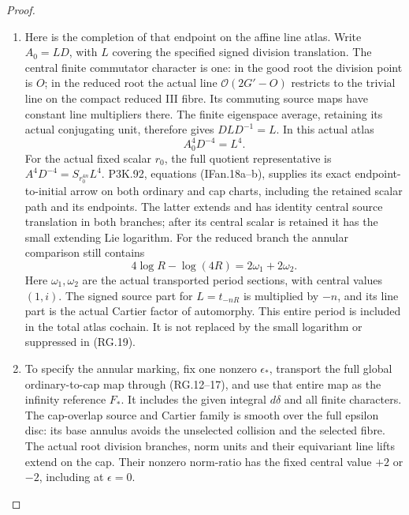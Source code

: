 \begin{proof}
\begin{enumerate}[label=\arabic*.]
\item Here is the completion of that endpoint on the affine line
atlas. Write \(A_0=L D\), with \(L\) covering the specified
signed division translation. The central finite commutator
character is one: in the good root the division point is \(O\);
in the reduced root the actual line
\(\mathcal O(2G'-O)\) restricts to the trivial line on the
compact reduced III fibre. Its commuting source maps have
constant line multipliers there. The finite eigenspace
average, retaining its actual conjugating unit, therefore
gives \(DLD^{-1}=L\). In this actual atlas
\[
                         A_0^4D^{-4}=L^4.
                                                        \tag{RG.19}
\]
For the actual fixed scalar \(r_0\), the full quotient
representative is \(A^4D^{-4}=S_{r_0^{4n}}L^4\).
P3K.92, equations (IFan.18a--b), supplies its exact
endpoint-to-initial arrow on both ordinary and cap charts,
including the retained scalar path and its endpoints.
The latter extends and has identity central source translation
in both branches; after its central scalar is retained it has
the small extending Lie logarithm. For the reduced branch the
annular comparison still contains
\[
                    4\log R-\log(4R)=2\omega_1+2\omega_2.
                                                        \tag{RG.20}
\]
Here \(\omega_1,\omega_2\) are the actual transported period
sections, with central values \((1,i)\). The signed source part
for \(L=t_{-nR}\) is multiplied by \(-n\), and its line
part is the actual Cartier factor of automorphy. This entire
period is included in the total atlas cochain. It is not
replaced by the small logarithm or suppressed in (RG.19).

\item To specify the annular marking, fix one nonzero
\(\epsilon_*\), transport the full global ordinary-to-cap
map through (RG.12--17), and use that entire map as the
infinity reference \(F_*\). It includes the given integral
\(d\delta\) and all finite characters. The cap-overlap source
and Cartier family is smooth over the full epsilon disc:
its base annulus avoids the unselected collision and the
selected fibre. The actual root division branches, norm
units and their equivariant line lifts extend on the cap.
Their nonzero norm-ratio has the fixed central value \(+2\)
or \(-2\), including at \(\epsilon=0\).


\end{enumerate}
\end{proof}
